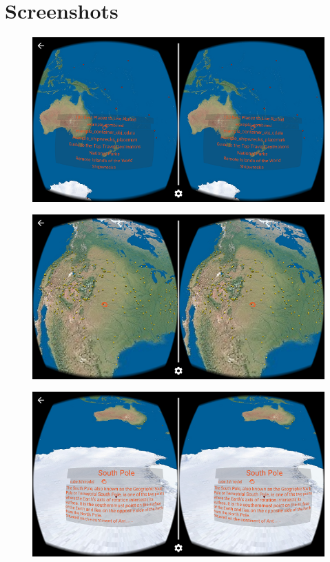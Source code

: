 \chapter{Screenshots}
\label{appendix-screenshots}

\begin{figure}[H]
	\centering
	\includegraphics[width=\textwidth, keepaspectratio]{Figures/Screenshots/kml-chooser.png}
	\decoRule
\end{figure}

\begin{figure}[H]
	\centering
	\includegraphics[width=\textwidth, keepaspectratio]{Figures/Screenshots/ray-spinner.png}
	\decoRule
\end{figure}

\begin{figure}[H]
	\centering
	\includegraphics[width=\textwidth, keepaspectratio]{Figures/Screenshots/placemark-text.png}
	\decoRule
\end{figure}

